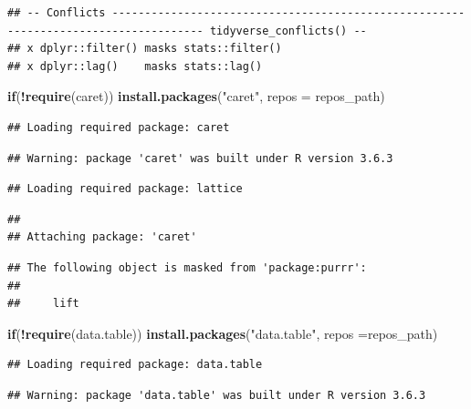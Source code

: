 \documentclass[]{article}
\newenvironment{Shaded}{\begin{snugshade}}{\end{snugshade}}
\newcommand{\ControlFlowTok}[1]{\textcolor[rgb]{0.13,0.29,0.53}{\textbf{#1}}}
\newcommand{\DataTypeTok}[1]{\textcolor[rgb]{0.13,0.29,0.53}{#1}}
\newcommand{\KeywordTok}[1]{\textcolor[rgb]{0.13,0.29,0.53}{\textbf{#1}}}
\newcommand{\NormalTok}[1]{#1}
\newcommand{\OperatorTok}[1]{\textcolor[rgb]{0.81,0.36,0.00}{\textbf{#1}}}
\newcommand{\StringTok}[1]{\textcolor[rgb]{0.31,0.60,0.02}{#1}}
\begin{document}
\begin{verbatim}
## -- Conflicts ------------------------------------------------------------------------------------ tidyverse_conflicts() --
## x dplyr::filter() masks stats::filter()
## x dplyr::lag()    masks stats::lag()
\end{verbatim}

\begin{Shaded}
\begin{Highlighting}[]
\ControlFlowTok{if}\NormalTok{(}\OperatorTok{!}\KeywordTok{require}\NormalTok{(caret)) }\KeywordTok{install.packages}\NormalTok{(}\StringTok{"caret"}\NormalTok{, }\DataTypeTok{repos =}\NormalTok{ repos_path)}
\end{Highlighting}
\end{Shaded}

\begin{verbatim}
## Loading required package: caret
\end{verbatim}

\begin{verbatim}
## Warning: package 'caret' was built under R version 3.6.3
\end{verbatim}

\begin{verbatim}
## Loading required package: lattice
\end{verbatim}

\begin{verbatim}
## 
## Attaching package: 'caret'
\end{verbatim}

\begin{verbatim}
## The following object is masked from 'package:purrr':
## 
##     lift
\end{verbatim}

\begin{Shaded}
\begin{Highlighting}[]
\ControlFlowTok{if}\NormalTok{(}\OperatorTok{!}\KeywordTok{require}\NormalTok{(data.table)) }\KeywordTok{install.packages}\NormalTok{(}\StringTok{"data.table"}\NormalTok{, }\DataTypeTok{repos =}\NormalTok{repos_path)}
\end{Highlighting}
\end{Shaded}

\begin{verbatim}
## Loading required package: data.table
\end{verbatim}

\begin{verbatim}
## Warning: package 'data.table' was built under R version 3.6.3
\end{verbatim}
\end{document}
